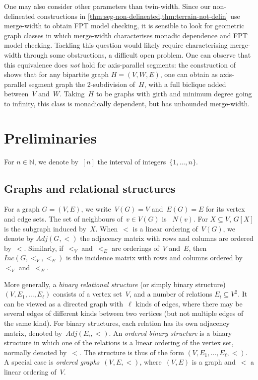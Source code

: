 \documentclass[a4paper,UKenglish,cleveref,thm-restate]{lipics-v2021}
\theoremstyle{remark}
\newcommand{\N}{\mathbb{N}}
\newcommand{\adj}{Adj}
\newcommand{\inc}{Inc}
\begin{document}
One may also consider other parameters than twin-width.
Since our non-delineated constructions in \cref{thm:seg-non-delineated,thm:terrain-not-delin} use merge-width to obtain FPT model checking,
it is sensible to look for geometric graph classes in which merge-width characterises monadic dependence and FPT model checking.
Tackling this question would likely require characterising merge-width through some obstructions, a difficult open problem.
One can observe that this equivalence does \emph{not} hold for axis-parallel segments:
the construction of \cite[Figure~8]{bonnet2022delineation} shows that for any bipartite graph $H = (V,W,E)$,
one can obtain as axis-parallel segment graph the 2-subdivision of~$H$, with a full biclique added between~$V$ and~$W$.
Taking~$H$ to be graphs with girth and minimum degree going to infinity, this class is monadically dependent, but has unbounded merge-width.


\section{Preliminaries}\label{sec:prelim}
For $n \in \N$, we denote by~$[n]$ the interval of integers~$\{1,\dots,n\}$.

\subsection{Graphs and relational structures}
For a graph $G = (V,E)$, we write~$V(G)=V$ and~$E(G)=E$ for its vertex and edge sets.
The set of neighbours of~$v \in V(G)$ is ~$N(v)$. For $X \subseteq V$, $G[X]$ is the subgraph induced by~$X$.
When~$<$ is a linear ordering of~$V(G)$, we denote by $\adj(G,<)$ the adjacency matrix with rows and columns are ordered by~$<$.
Similarly, if~$<_V$ and~$<_E$ are orderings of~$V$ and~$E$,
then $\inc(G,<_V,<_E)$ is the incidence matrix with rows and columns ordered by~$<_V$ and~$<_E$.

More generally, a \emph{binary relational structure} (or simply binary structure) $(V,E_1,\dots,E_\ell)$
consists of a vertex set~$V$, and a number of relations $E_i \subseteq V^2$.
It can be viewed as a directed graph with~$\ell$ kinds of edges,
where there may be several edges of different kinds between two vertices (but not multiple edges of the same kind).
For binary structures, each relation has its own adjacency matrix, denoted by~$\adj(E_i,<)$.
An \emph{ordered binary structure} is a binary structure in which one of the relations is a linear ordering of the vertex set, normally denoted by~$<$. The structure is thus of the form $(V,E_1,\dots,E_\ell,<)$.
A special case is \emph{ordered graphs}~$(V,E,<)$, where~$(V,E)$ is a graph and~$<$ a linear ordering of~$V$.
\end{document}
